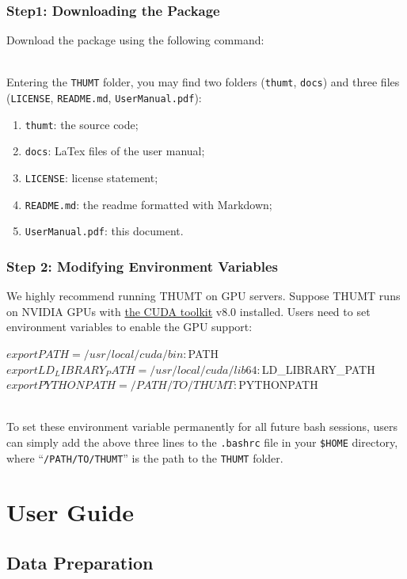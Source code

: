 \documentclass{article}
\begin{document}
\subsubsection{Step1: Downloading the Package}
Download the package using the following command:
\\
\\
Entering the \verb|THUMT| folder, you may find two folders (\verb|thumt|, \verb|docs|) and three files (\verb|LICENSE|, \verb|README.md|, \verb|UserManual.pdf|):
\begin{enumerate}
\item \verb|thumt|: the source code;
\item \verb|docs|: LaTex files of the user manual;
\item \verb|LICENSE|: license statement;
\item \verb|README.md|: the readme formatted with Markdown;
\item \verb|UserManual.pdf|: this document.
\end{enumerate}

\subsubsection{Step 2: Modifying Environment Variables}
We highly recommend running THUMT on GPU servers. Suppose THUMT runs on NVIDIA GPUs with \href{https://developer.nvidia.com/cuda-toolkit}{the CUDA toolkit} v8.0 installed. Users need to set environment variables to enable the GPU support: 
\\
\begin{everbatim}
$ export PATH=/usr/local/cuda/bin:$PATH
$ export LD_LIBRARY_PATH=/usr/local/cuda/lib64:$LD_LIBRARY_PATH
$ export PYTHONPATH=/PATH/TO/THUMT:$PYTHONPATH
\end{everbatim}
\\
To set these environment variable permanently for all future bash sessions, users can simply add the above three lines to the \verb|.bashrc| file in your \verb|$HOME| directory, where ``\verb|/PATH/TO/THUMT|'' is the path to the \verb|THUMT| folder. 

\section{User Guide}

\subsection{Data Preparation}
\end{document}
